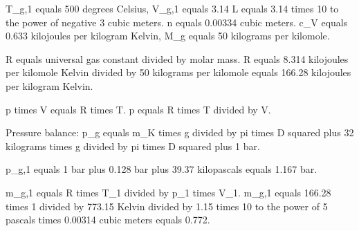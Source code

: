 T_g,1 equals 500 degrees Celsius, V_g,1 equals 3.14 L equals 3.14 times 10 to the power of negative 3 cubic meters.  
n equals 0.00334 cubic meters.  
c_V equals 0.633 kilojoules per kilogram Kelvin, M_g equals 50 kilograms per kilomole.  

R equals universal gas constant divided by molar mass.  
R equals 8.314 kilojoules per kilomole Kelvin divided by 50 kilograms per kilomole equals 166.28 kilojoules per kilogram Kelvin.  

p times V equals R times T.  
p equals R times T divided by V.  

Pressure balance:  
p_g equals m_K times g divided by pi times D squared plus 32 kilograms times g divided by pi times D squared plus 1 bar.  

p_g,1 equals 1 bar plus 0.128 bar plus 39.37 kilopascals equals 1.167 bar.  

m_g,1 equals R times T_1 divided by p_1 times V_1.  
m_g,1 equals 166.28 times 1 divided by 773.15 Kelvin divided by 1.15 times 10 to the power of 5 pascals times 0.00314 cubic meters equals 0.772.